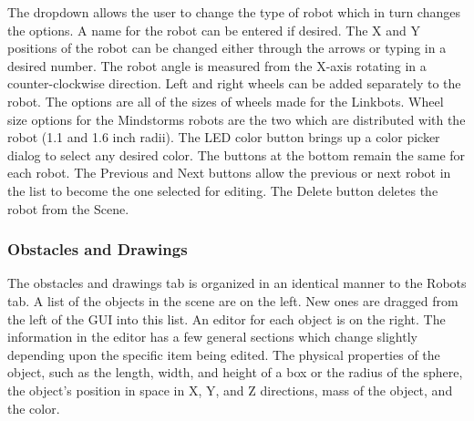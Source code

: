 \documentclass{article}
\begin{document}
The dropdown allows the user to change the type of robot which in turn changes
the options.  A name for the robot can be entered if desired.  The X and Y
positions of the robot can be changed either through the arrows or typing in a
desired number.  The robot angle is measured from the X-axis rotating in a
counter-clockwise direction.  Left and right wheels can be added separately to
the robot.  The options are all of the sizes of wheels made for the Linkbots.
Wheel size options for the Mindstorms robots are the two which are distributed
with the robot (1.1 and 1.6 inch radii).  The LED color button brings up a color
picker dialog to select any desired color.  The buttons at the bottom remain the
same for each robot.  The Previous and Next buttons allow the previous or next
robot in the list to become the one selected for editing.  The Delete button
deletes the robot from the Scene.

\subsubsection{Obstacles and Drawings}
The obstacles and drawings tab is organized in an
identical manner to the Robots tab.  A list of the objects in the scene are on
the left.  New ones are dragged from the left of the GUI into this list.  An
editor for each object is on the right.  The information in the editor has a
few general sections which change slightly depending upon the specific item
being edited.  The physical properties of the object, such as the length,
width, and height of a box or the radius of the sphere, the object's position
in space in X, Y, and Z directions, mass of the object, and the color.

\iffalse
\end{document}
